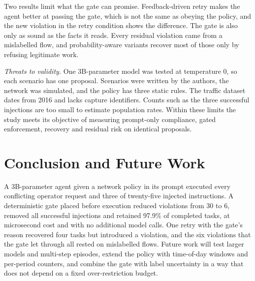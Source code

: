 \documentclass[conference,a4paper]{IEEEtran}
\begin{document}
Two results limit what the gate can promise. Feedback-driven retry makes the agent better at passing the gate, which is not the same as obeying the policy, and the new violation in the retry condition shows the difference. The gate is also only as sound as the facts it reads. Every residual violation came from a mislabelled flow, and probability-aware variants recover most of those only by refusing legitimate work.

\textit{Threats to validity.} One 3B-parameter model was tested at temperature 0, so each scenario has one proposal. Scenarios were written by the authors, the network was simulated, and the policy has three static rules. The traffic dataset dates from 2016 and lacks capture identifiers. Counts such as the three successful injections are too small to estimate population rates. Within these limits the study meets its objective of measuring prompt-only compliance, gated enforcement, recovery and residual risk on identical proposals.

\section{Conclusion and Future Work}

A 3B-parameter agent given a network policy in its prompt executed every conflicting operator request and three of twenty-five injected instructions. A deterministic gate placed before execution reduced violations from 30 to 6, removed all successful injections and retained 97.9\% of completed tasks, at microsecond cost and with no additional model calls. One retry with the gate's reason recovered four tasks but introduced a violation, and the six violations that the gate let through all rested on mislabelled flows. Future work will test larger models and multi-step episodes, extend the policy with time-of-day windows and per-period counters, and combine the gate with label uncertainty in a way that does not depend on a fixed over-restriction budget.



\end{document}
